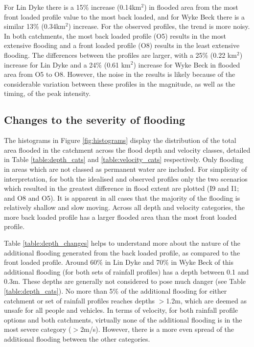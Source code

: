 \documentclass[APA,Times2COL]{WileyNJDv5}
\begin{document}
For Lin Dyke there is a 15\% increase (0.14km$^2$) in flooded area from the most front loaded profile value to the most back loaded, and for Wyke Beck there is a similar 13\% (0.34km$^2$) increase. For the observed profiles, the trend is more noisy. In both catchments, the most back loaded profile (O5) results in the most extensive flooding and a front loaded profile (O8) results in the least extensive flooding. The differences between the profiles are larger, with a 25\% (0.22 km$^2$) increase for Lin Dyke and a 24\% (0.61 km$^2$) increase for Wyke Beck in flooded area from O5 to O8. However, the noise in the results is likely because of the considerable variation between these profiles in the magnitude, as well as the timing, of the peak intensity. 


\subsection{Changes to the severity of flooding}\label{subsec:model}
The histograms in Figure \ref{fig:histograms} display the distribution of the total area flooded in the catchment across the flood depth and velocity classes, detailed in Table \ref{table:depth_cats} and \ref{table:velocity_cats} respectively. Only flooding in areas which are not classed as permanent water are included. For simplicity of interpretation, for both the idealised and observed profiles only the two scenarios which resulted in the greatest difference in flood extent are plotted (I9 and I1; and O8 and O5). It is apparent in all cases that the majority of the flooding is relatively shallow and slow moving. Across all depth and velocity categories, the more back loaded profile has a larger flooded area than the most front loaded profile.  

Table \ref{table:depth_changes} helps to understand more about the nature of the additional flooding generated from the back loaded profile, as compared to the front loaded profile. Around 60\% in Lin Dyke and 70\% in Wyke Beck of this additional flooding (for both sets of rainfall profiles) has a depth between 0.1 and 0.3m. These depths are generally not considered to pose much danger (see Table \ref{table:depth_cats}). No more than 5\% of the additional flooding for either catchment or set of rainfall profiles reaches depths $>$1.2m, which are deemed as unsafe for all people and vehicles. In terms of velocity, for both rainfall profile options and both catchments, virtually none of the additional flooding is in the most severe category ($>$2m/s). However, there is a more even spread of the additional flooding between the other categories. 
\end{document}
